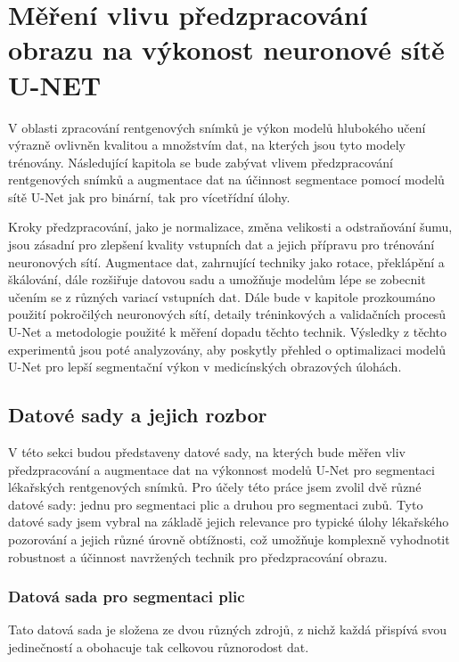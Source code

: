 \documentclass[male,czech,api_ing]{thesis}
\begin{document}
\chapter{Měření vlivu předzpracování obrazu na výkonost neuronové sítě U-NET}
V oblasti zpracování rentgenových snímků je výkon modelů hlubokého učení výrazně ovlivněn kvalitou a množstvím dat, na kterých jsou tyto modely trénovány. Následující kapitola se bude zabývat vlivem předzpracování rentgenových snímků a augmentace dat na účinnost segmentace pomocí modelů sítě U-Net jak pro binární, tak pro vícetřídní úlohy.

Kroky předzpracování, jako je normalizace, změna velikosti a odstraňování šumu, jsou zásadní pro zlepšení kvality vstupních dat a jejich přípravu pro trénování neuronových sítí. Augmentace dat, zahrnující techniky jako rotace, překlápění a škálování, dále rozšiřuje datovou sadu a umožňuje modelům lépe se zobecnit učením se z různých variací vstupních dat. Dále bude v kapitole prozkoumáno použití pokročilých neuronových sítí, detaily tréninkových a validačních procesů U-Net a metodologie použité k měření dopadu těchto technik. Výsledky z těchto experimentů jsou poté analyzovány, aby poskytly přehled o optimalizaci modelů U-Net pro lepší segmentační výkon v medicínských obrazových úlohách.

\section{Datové sady a jejich rozbor}
V této sekci budou představeny datové sady, na kterých bude měřen vliv předzpracování a augmentace dat na výkonnost modelů U-Net pro segmentaci lékařských rentgenových snímků. Pro účely této práce jsem zvolil dvě různé datové sady: jednu pro segmentaci plic a druhou pro segmentaci zubů. Tyto datové sady jsem vybral na základě jejich relevance pro typické úlohy lékařského pozorování a jejich různé úrovně obtížnosti, což umožňuje komplexně vyhodnotit robustnost a účinnost navržených technik pro předzpracování obrazu.

\subsection{Datová sada pro segmentaci plic}
Tato datová sada je složena ze dvou různých zdrojů, z nichž každá přispívá svou jedinečností a obohacuje tak celkovou různorodost dat.
\end{document}
